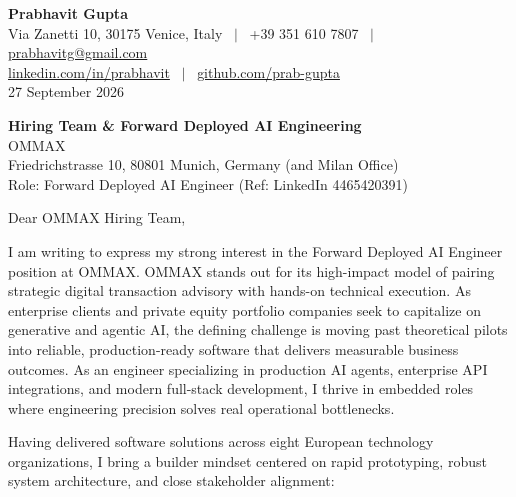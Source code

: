 \documentclass[10.5pt,a4paper]{article}
\begin{document}
\textbf{\large Prabhavit Gupta}\\
Via Zanetti 10, 30175 Venice, Italy ~$\vert$~ +39 351 610 7807 ~$\vert$~ \href{mailto:prabhavitg@gmail.com}{prabhavitg@gmail.com}\\
\href{https://www.linkedin.com/in/prabhavit/}{linkedin.com/in/prabhavit} ~$\vert$~ \href{https://github.com/prab-gupta}{github.com/prab-gupta}\\
27 September 2026

\textbf{Hiring Team \& Forward Deployed AI Engineering}\\
OMMAX\\
Friedrichstrasse 10, 80801 Munich, Germany (and Milan Office)\\
Role: Forward Deployed AI Engineer (Ref: LinkedIn 4465420391)

Dear OMMAX Hiring Team,

I am writing to express my strong interest in the Forward Deployed AI Engineer position at OMMAX. OMMAX stands out for its high-impact model of pairing strategic digital transaction advisory with hands-on technical execution. As enterprise clients and private equity portfolio companies seek to capitalize on generative and agentic AI, the defining challenge is moving past theoretical pilots into reliable, production-ready software that delivers measurable business outcomes. As an engineer specializing in production AI agents, enterprise API integrations, and modern full-stack development, I thrive in embedded roles where engineering precision solves real operational bottlenecks.

Having delivered software solutions across eight European technology organizations, I bring a builder mindset centered on rapid prototyping, robust system architecture, and close stakeholder alignment:
\end{document}
